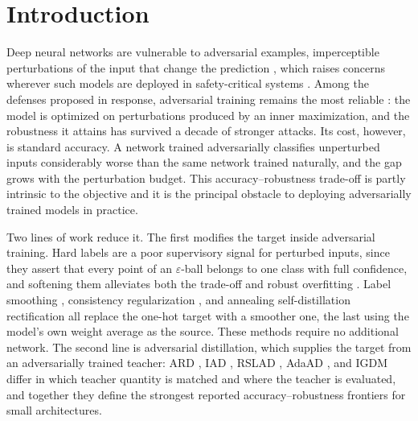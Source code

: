 
\section{Introduction}

Deep neural networks are vulnerable to adversarial examples, imperceptible perturbations of the input
that change the prediction \citep{szegedy2014intriguing, goodfellow2015explaining,
carlini2017towards}, which raises concerns wherever such models are deployed in safety-critical
systems \citep{grigorescu2020survey, ma2021understanding}. Among the defenses proposed in response,
adversarial training \citep{madry2018towards} remains the most reliable \citep{athalye2018obfuscated,
croce2020reliable}: the model is optimized on perturbations produced by an inner maximization, and
the robustness it attains has survived a decade of stronger attacks. Its cost, however, is standard
accuracy. A network trained adversarially classifies unperturbed inputs considerably worse than the
same network trained naturally, and the gap grows with the perturbation budget. This
accuracy--robustness trade-off is partly intrinsic to the objective \citep{tsipras2019robustness,
zhang2019theoretically} and it is the principal obstacle to deploying adversarially trained models in
practice.

Two lines of work reduce it. The first modifies the target inside adversarial training. Hard labels
are a poor supervisory signal for perturbed inputs, since they assert that every point of an
$\varepsilon$-ball belongs to one class with full confidence, and softening them alleviates both the
trade-off and robust overfitting \citep{rice2020overfitting}. Label smoothing
\citep{pang2021bag}, consistency regularization \citep{dong2022exploring}, and annealing
self-distillation rectification \citep{wu2024annealing} all replace the one-hot target with a smoother
one, the last using the model's own weight average as the source. These methods require no additional
network. The second line is adversarial distillation, which supplies the target from an adversarially
trained teacher: ARD \citep{goldblum2020adversarially}, IAD \citep{zhu2022reliable}, RSLAD
\citep{zi2021revisiting}, AdaAD \citep{huang2023boosting}, and IGDM \citep{lee2025indirect} differ in
which teacher quantity is matched and where the teacher is evaluated, and together they define the
strongest reported accuracy--robustness frontiers for small architectures.

